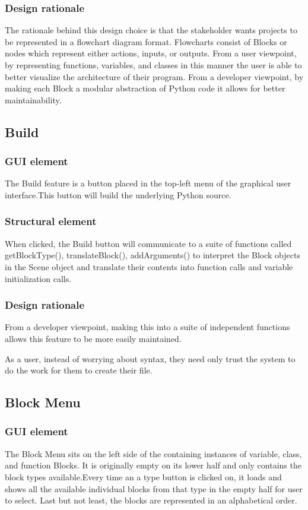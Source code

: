 \documentclass[journal,10pt,onecolumn,compsoc]{IEEEtran} \usepackage[margin=1.0in]{geometry} \usepackage{pdfpages}
\begin{document}
\subsubsection{Design rationale}
\noindent The rationale behind this design choice is that the stakeholder wants projects to be represented in a flowchart diagram format.
Flowcharts consist of Blocks or nodes which represent either actions, inputs, or outputs.
From a user viewpoint, by representing functions, variables, and classes in this manner the user is able to better visualize the architecture of their program.
From a developer viewpoint, by making each Block a modular abstraction of Python code it allows for better maintainability.

\subsection{Build}
\subsubsection{GUI element}
\noindent The Build feature is a button placed in the top-left menu of the graphical user interface.This  button will build the underlying Python source.
\subsubsection{Structural element}
\noindent When clicked, the Build button will communicate to a suite of functions called getBlockType(), translateBlock(), addArguments() to interpret the Block objects in the Scene object and translate their contents into function calls and variable initialization calls.\cite{pythonvar}\cite{pythonfunction}
\subsubsection{Design rationale}
\noindent From a developer viewpoint, making this into a suite of independent functions allows this feature to be more easily maintained.

\noindent As a user, instead of worrying about syntax, they need only trust the system to do the work for them to create their file.
\subsection{Block Menu}
\subsubsection{GUI element}
\noindent The Block Menu sits on the left side of the  containing instances of variable, class, and function Blocks. It is originally empty on its lower half and only contains the block types available.Every time an a type button is clicked on, it loads and shows all the available individual blocks from that type in the empty half for user to select.
Last but not least, the blocks are represented in an alphabetical order.
\end{document}

